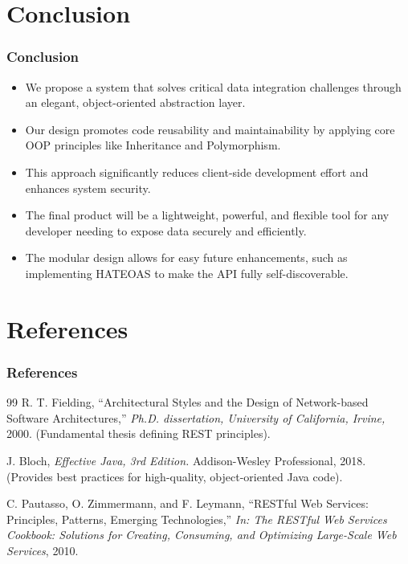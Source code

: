 \documentclass{beamer}
\begin{document}
\section{Conclusion}
\begin{frame}
  \frametitle{Conclusion}
    \begin{itemize}
        \item We propose a system that solves critical data integration challenges through an elegant, object-oriented abstraction layer.
        \pause
        \item Our design promotes code reusability and maintainability by applying core OOP principles like Inheritance and Polymorphism.
        \pause
        \item This approach significantly reduces client-side development effort and enhances system security.
        \pause
        \item The final product will be a lightweight, powerful, and flexible tool for any developer needing to expose data securely and efficiently.
        \pause
        \item The modular design allows for easy future enhancements, such as implementing HATEOAS to make the API fully self-discoverable.
    \end{itemize}
\end{frame}

\section{References}
\begin{frame}
  \frametitle{References}
  \begin{thebibliography}{99}
    R. T. Fielding, “Architectural Styles and the Design of Network-based Software Architectures,”
    \emph{Ph.D. dissertation, University of California, Irvine,} 2000.
    \newblock (Fundamental thesis defining REST principles).
    
    J. Bloch, \emph{Effective Java, 3rd Edition.}
    \newblock Addison-Wesley Professional, 2018.
    \newblock (Provides best practices for high-quality, object-oriented Java code).

    C. Pautasso, O. Zimmermann, and F. Leymann, “RESTful Web Services: Principles, Patterns, Emerging Technologies,”
    \emph{In: The RESTful Web Services Cookbook: Solutions for Creating, Consuming, and Optimizing Large-Scale Web Services}, 2010.
    
  \end{thebibliography}
\end{frame}
\end{document}
